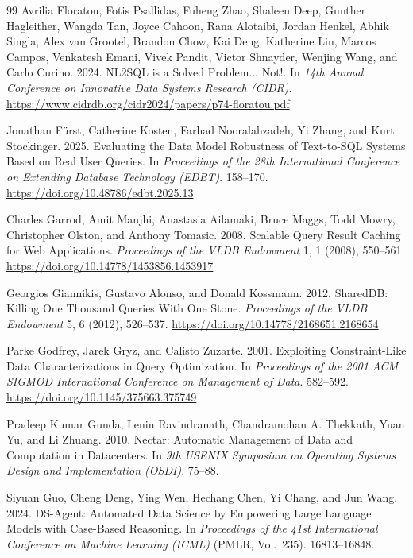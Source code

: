\begin{thebibliography}{99}
Avrilia Floratou, Fotis Psallidas, Fuheng Zhao, Shaleen Deep, Gunther Hagleither, Wangda Tan, Joyce Cahoon, Rana Alotaibi, Jordan Henkel, Abhik Singla, Alex van Grootel, Brandon Chow, Kai Deng, Katherine Lin, Marcos Campos, Venkatesh Emani, Vivek Pandit, Victor Shnayder, Wenjing Wang, and Carlo Curino. 2024. NL2SQL is a Solved Problem... Not!. In \emph{14th Annual Conference on Innovative Data Systems Research (CIDR)}. \url{https://www.cidrdb.org/cidr2024/papers/p74-floratou.pdf}

Jonathan F{\"u}rst, Catherine Kosten, Farhad Nooralahzadeh, Yi Zhang, and Kurt Stockinger. 2025. Evaluating the Data Model Robustness of Text-to-SQL Systems Based on Real User Queries. In \emph{Proceedings of the 28th International Conference on Extending Database Technology (EDBT)}. 158--170. \url{https://doi.org/10.48786/edbt.2025.13}

Charles Garrod, Amit Manjhi, Anastasia Ailamaki, Bruce Maggs, Todd Mowry, Christopher Olston, and Anthony Tomasic. 2008. Scalable Query Result Caching for Web Applications. \emph{Proceedings of the VLDB Endowment} 1, 1 (2008), 550--561. \url{https://doi.org/10.14778/1453856.1453917}

Georgios Giannikis, Gustavo Alonso, and Donald Kossmann. 2012. SharedDB: Killing One Thousand Queries With One Stone. \emph{Proceedings of the VLDB Endowment} 5, 6 (2012), 526--537. \url{https://doi.org/10.14778/2168651.2168654}

Parke Godfrey, Jarek Gryz, and Calisto Zuzarte. 2001. Exploiting Constraint-Like Data Characterizations in Query Optimization. In \emph{Proceedings of the 2001 ACM SIGMOD International Conference on Management of Data}. 582--592. \url{https://doi.org/10.1145/375663.375749}

Pradeep Kumar Gunda, Lenin Ravindranath, Chandramohan A. Thekkath, Yuan Yu, and Li Zhuang. 2010. Nectar: Automatic Management of Data and Computation in Datacenters. In \emph{9th USENIX Symposium on Operating Systems Design and Implementation (OSDI)}. 75--88.

Siyuan Guo, Cheng Deng, Ying Wen, Hechang Chen, Yi Chang, and Jun Wang. 2024. DS-Agent: Automated Data Science by Empowering Large Language Models with Case-Based Reasoning. In \emph{Proceedings of the 41st International Conference on Machine Learning (ICML)} (PMLR, Vol.~235). 16813--16848.


\end{thebibliography}
